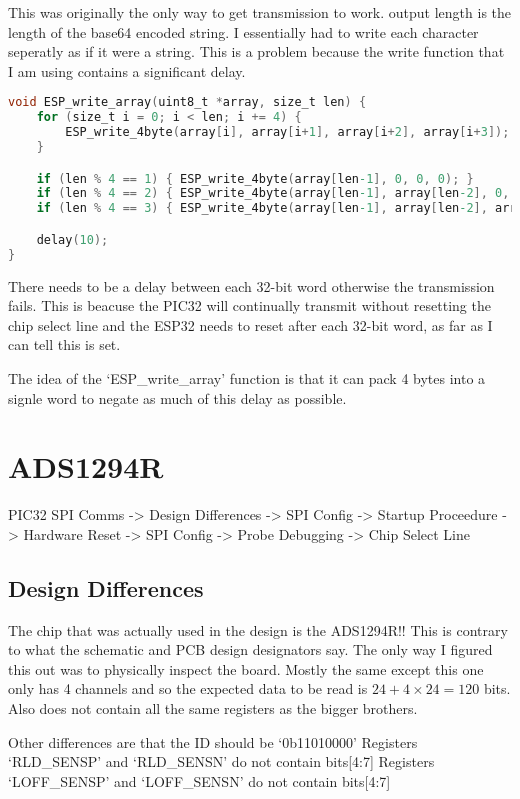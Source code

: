 This was originally the only way to get transmission to work.
output length is the length of the base64 encoded string.
I essentially had to write each character seperatly as if it were a string.
This is a problem because the write function that I am using contains a significant delay.

\begin{lstlisting}[language=C]
void ESP_write_array(uint8_t *array, size_t len) {
    for (size_t i = 0; i < len; i += 4) {
        ESP_write_4byte(array[i], array[i+1], array[i+2], array[i+3]);
    }

    if (len % 4 == 1) { ESP_write_4byte(array[len-1], 0, 0, 0); }
    if (len % 4 == 2) { ESP_write_4byte(array[len-1], array[len-2], 0, 0); }
    if (len % 4 == 3) { ESP_write_4byte(array[len-1], array[len-2], array[len-3], 0); }

    delay(10);
}
\end{lstlisting}

There needs to be a delay between each 32-bit word otherwise the transmission fails.
This is beacuse the PIC32 will continually transmit without resetting the chip select line
and the ESP32 needs to reset after each 32-bit word, as far as I can tell this is set.

The idea of the `ESP\_write\_array' function is that it can pack 4 bytes into a signle word
to negate as much of this delay as possible.


\section{ADS1294R}
PIC32 SPI Comms -> Design Differences -> SPI Config -> Startup Proceedure -> Hardware Reset -> SPI Config -> Probe Debugging -> Chip Select Line

\subsection{Design Differences}
The chip that was actually used in the design is the ADS1294R!!
This is contrary to what the schematic and PCB design designators say.
The only way I figured this out was to physically inspect the board.
Mostly the same except this one only has 4 channels and so the expected data
to be read is \(24 + 4 \times 24 = 120\) bits.
Also does not contain all the same registers as the bigger brothers.

Other differences are that the ID should be `0b11010000'
Registers `RLD\_SENSP' and `RLD\_SENSN' do not contain bits[4:7]
Registers `LOFF\_SENSP' and `LOFF\_SENSN' do not contain bits[4:7]

